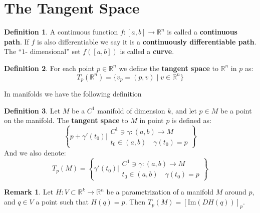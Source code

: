 \documentclass[11pt,a4paper]{article}
\theoremstyle{definition}
\newtheorem{definition}{Definition}[section]
\newtheorem{remark}{Remark}[section]
\theoremstyle{plain}
\newcommand{\R}{\mathbb{R}}
\begin{document}
	\section{The Tangent Space}
	\begin{definition}
		A continuous function $f \colon [a,b] \to \R^n$ is called a
		\textbf{continuous path}. If $f$ is also differentiable we say
		it is a \textbf{continuously differentiable path}. The ``$1$-
		dimensional'' set $f([a,b])$ is called a \textbf{curve}.
	\end{definition}
	\begin{definition}
		For each point $p \in \R^n$ we define the \textbf{tangent space}
		to $\R^n$ in $p$ as:
		\[
			T_p(\R^n) = \{v_p = (p,v) \mid v \in \R^n\}
		\]
	\end{definition}
	In manifolds we have the following definition
	\begin{definition}
		Let $M$ be a $C^1$ manifold of dimension $k$, and let $p \in M$ 
		be a point on the manifold. The \textbf{tangent space} to $M$ in 
		point $p$ is defined as:
		\[
			\left\{
				p + \gamma'(t_0) \biggr\vert 
				\substack{
				C^1 \ni \gamma \colon (a,b) \to M \\
				t_0 \in (a,b) \quad \gamma(t_0) = p}
			\right\}
		\]
		And we also denote:
		\[
			T_p(M) = \left\{
				\gamma'(t_0) \biggr\vert 
				\substack{
				C^1 \ni \gamma \colon (a,b) \to M \\
				t_0 \in (a,b) \quad \gamma(t_0) = p}
			\right\}
		\]
	\end{definition}
	\begin{remark}
		Let $H \colon V \subset \R^k \to \R^n$ be a parametrization
		of a manifold $M$ around $p$, and $q \in V$ a point such that
		$H(q) = p$. Then $T_p(M) = [\mathrm{Im}(DH(q))]_p$.
	\end{remark}
\end{document}
